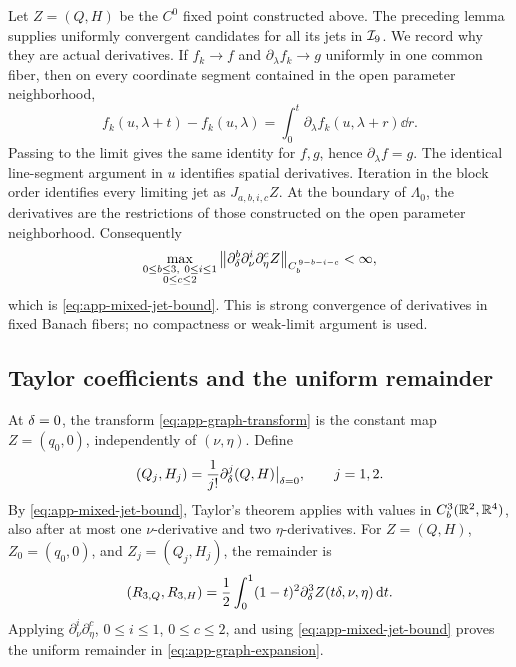 Let \(Z=(Q,H)\) be the \(C^0\) fixed point constructed above.  The preceding
lemma supplies uniformly convergent candidates for all its jets in
\(\mathcal I_9\).  We record why they are actual derivatives.  If
\(f_k\to f\) and \(\partial_\lambda f_k\to g\) uniformly in one common
fiber, then on every coordinate segment contained in the open parameter
neighborhood,
\begin{equation}
\label{eq:app-strong-jet-closure}
 f_k(u,\lambda+t)-f_k(u,\lambda)
 =\int_0^t\partial_\lambda f_k(u,\lambda+r)\dd r.
\end{equation}
Passing to the limit gives the same identity for \(f,g\), hence
\(\partial_\lambda f=g\).  The identical line-segment argument in \(u\)
identifies spatial derivatives.  Iteration in the block order identifies
every limiting jet as \(J_{a,b,i,c}Z\).  At the boundary of \(\Lambda_0\),
the derivatives are the restrictions of those constructed on the open
parameter neighborhood.  Consequently
\[
 \max_{\substack{0\leq b\leq3,\ 0\leq i\leq1\\0\leq c\leq2}}
 \left\lVert \partial_\delta^b\partial_\nu^i\partial_\eta^cZ\right\rVert
       _{C_b^{\,9-b-i-c}}<\infty,
\]
which is \cref{eq:app-mixed-jet-bound}.  This is strong convergence of
derivatives in fixed Banach fibers; no compactness or weak-limit argument is
used.

\subsection{Taylor coefficients and the uniform remainder}
\label{app:compact-Taylor-remainder}

At \(\delta=0\), the transform \cref{eq:app-graph-transform} is the constant
map \(Z=(q_0,0)\), independently of \((\nu,\eta)\).  Define
\begin{equation}
\label{eq:app-Taylor-coefficients}
 (Q_j,H_j)=\frac1{j!}
 \partial_\delta^j(Q,H)\big|_{\delta=0},
 \qquad j=1,2.
\end{equation}
By \cref{eq:app-mixed-jet-bound}, Taylor's theorem applies with values in
\(C_b^3(\mathbb R^2,\mathbb R^4)\), also after at most one \(\nu\)-derivative and two
\(\eta\)-derivatives.  For
\(Z=(Q,H)\), \(Z_0=(q_0,0)\), and \(Z_j=(Q_j,H_j)\), the remainder is
\begin{equation}
\label{eq:app-integral-Taylor-remainder}
 (R_{3,Q},R_{3,H})
 =\frac12\int_0^1(1-t)^2
   \partial_\delta^3Z(t\delta,\nu,\eta)\,\mathrm d t.
\end{equation}
Applying \(\partial_\nu^i\partial_\eta^c\),
\(0\leq i\leq1\), \(0\leq c\leq2\), and using
\cref{eq:app-mixed-jet-bound} proves the uniform remainder in
\cref{eq:app-graph-expansion}.

